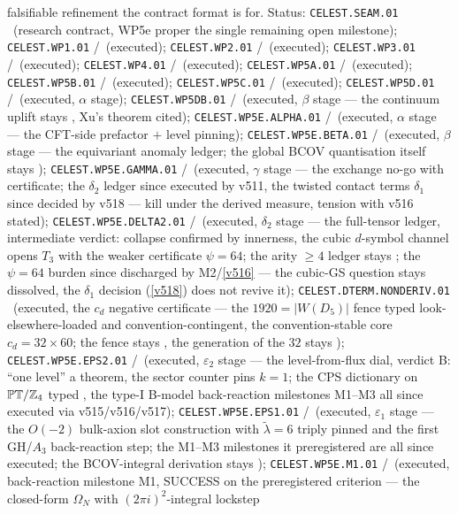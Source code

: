 falsifiable refinement the contract format is for. Status: \texttt{CELEST.SEAM.01} \mO\ (research
contract, WP5e proper the single remaining open milestone); \texttt{CELEST.WP1.01} \mE/\mC\ (executed);
\texttt{CELEST.WP2.01} \mE/\mC\ (executed); \texttt{CELEST.WP3.01} \mE/\mC\ (executed);
\texttt{CELEST.WP4.01} \mE/\mC\ (executed); \texttt{CELEST.WP5A.01} \mE/\mC\ (executed);
\texttt{CELEST.WP5B.01} \mE/\mC\ (executed); \texttt{CELEST.WP5C.01} \mE/\mC\ (executed);
\texttt{CELEST.WP5D.01} \mE/\mC\ (executed, $\alpha$ stage);
\texttt{CELEST.WP5DB.01} \mE/\mC\ (executed, $\beta$ stage --- the continuum uplift stays \mO,
Xu's theorem cited);
\texttt{CELEST.WP5E.ALPHA.01} \mE/\mC\ (executed, $\alpha$ stage --- the CFT-side prefactor $+$
level pinning);
\texttt{CELEST.WP5E.BETA.01} \mE/\mC\ (executed, $\beta$ stage --- the equivariant anomaly ledger;
the global BCOV quantisation itself stays \mO);
\texttt{CELEST.WP5E.GAMMA.01} \mE/\mC\ (executed, $\gamma$ stage --- the exchange no-go with
certificate; the $\delta_2$ ledger since executed by v511, the twisted contact terms $\delta_1$
since decided by v518 --- kill under the derived measure, tension with v516 stated);
\texttt{CELEST.WP5E.DELTA2.01} \mE/\mC\ (executed, $\delta_2$ stage --- the full-tensor ledger,
intermediate verdict: collapse confirmed by innerness, the cubic $d$-symbol channel opens $T_3$
with the weaker certificate $\psi=64$; the arity $\ge4$ ledger stays \mO; the $\psi=64$ burden
since discharged by M2/\vref{v516} --- the cubic-GS question stays dissolved, the $\delta_1$
decision (\vref{v518}) does not revive it);
\texttt{CELEST.DTERM.NONDERIV.01} \mE\ (executed, the $c_d$ negative certificate --- the
$1920=|W(D_5)|$ fence typed look-elsewhere-loaded and convention-contingent, the convention-stable
core $c_d=32\times60$; the fence stays \mC, the generation of the $32$ stays \mO);
\texttt{CELEST.WP5E.EPS2.01} \mE/\mC\ (executed, $\varepsilon_2$ stage --- the level-from-flux
dial, verdict B: ``one level'' a theorem, the sector counter pins $k=1$; the CPS dictionary on
$\mathbb{PT}/\mathbb Z_4$ typed \mC, the type-I B-model back-reaction milestones M1--M3 all since
executed via v515/v516/v517);
\texttt{CELEST.WP5E.EPS1.01} \mE/\mC\ (executed, $\varepsilon_1$ stage --- the $O(-2)$
bulk-axion slot construction with $\tilde\lambda=6$ triply pinned and the first GH/$A_3$
back-reaction step; the M1--M3 milestones it preregistered are all since executed; the
BCOV-integral derivation stays \mO);
\texttt{CELEST.WP5E.M1.01} \mE/\mC\ (executed, back-reaction milestone M1, SUCCESS on the
preregistered criterion --- the closed-form $\Omega_N$ with $(2\pi i)^2$-integral lockstep
